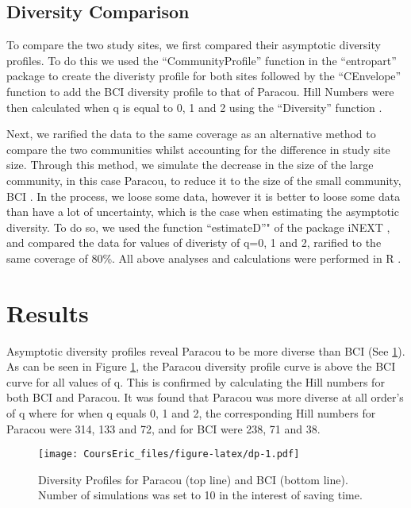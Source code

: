 \documentclass[fleqn,10pt]{ArtEcoFoG} %
\begin{document}
\subsection{Diversity Comparison}\label{diversity-comparison}

To compare the two study sites, we first compared their asymptotic
diversity profiles. To do this we used the ``CommunityProfile'' function
in the ``entropart'' package \citep{Marcon2014c} to create the diveristy
profile for both sites followed by the ``CEnvelope'' function
\citep{Marcon2014c} to add the BCI diversity profile to that of Paracou.
Hill Numbers were then calculated when q is equal to 0, 1 and 2 using
the ``Diversity'' function \citep{Marcon2014c}.

Next, we rarified the data to the same coverage as an alternative method
to compare the two communities whilst accounting for the difference in
study site size. Through this method, we simulate the decrease in the
size of the large community, in this case Paracou, to reduce it to the
size of the small community, BCI \citep{marcon2017}. In the process, we
loose some data, however it is better to loose some data than have a lot
of uncertainty, which is the case when estimating the asymptotic
diversity. To do so, we used the function ``estimateD''" of the package
iNEXT \citep{hsieh2016inext}, and compared the data for values of
diveristy of q=0, 1 and 2, rarified to the same coverage of 80\%. All
above analyses and calculations were performed in R \citep{R}.

\section{Results}\label{results}

Asymptotic diversity profiles reveal Paracou to be more diverse than BCI
(See \ref{fig:dp}). As can be seen in Figure \ref{fig:dp}, the Paracou
diversity profile curve is above the BCI curve for all values of q. This
is confirmed by calculating the Hill numbers for both BCI and Paracou.
It was found that Paracou was more diverse at all order's of q where for
when q equals 0, 1 and 2, the corresponding Hill numbers for Paracou
were 314, 133 and 72, and for BCI were 238, 71 and 38.

\begin{figure}
\centering
\texttt{[image: CoursEric\_files/figure-latex/dp-1.pdf]}
\caption{\label{fig:dp}Diversity Profiles for Paracou (top line) and BCI
(bottom line). Number of simulations was set to 10 in the interest of
saving time.}
\end{figure}
\end{document}
